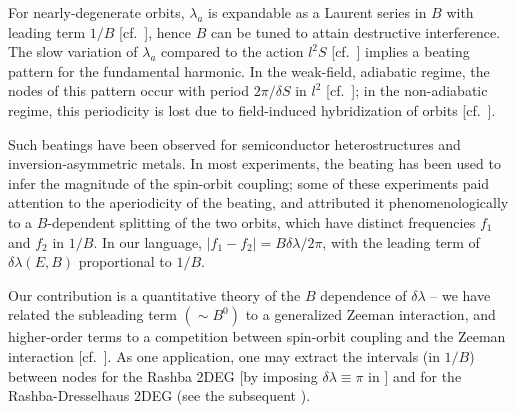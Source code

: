 \documentclass[aps, showpacs, twocolumn, notitlepage, superscriptaddress]{revtex4-1}
\begin{document}
For nearly-degenerate orbits, $\lambda_a$ is expandable as a Laurent series in $B$ with leading term $1/B$ [cf.\ ], hence $B$ can be tuned to attain destructive interference. The slow variation of $\lambda_a$ compared to the action $l^2S$ [cf.\ ] implies a beating pattern for the fundamental harmonic. In the weak-field, adiabatic regime, the nodes of this pattern occur with period $2\pi/\delta S$ in $l^2$ [cf.\ ]; in the non-adiabatic regime, this periodicity is lost due to field-induced hybridization of orbits [cf.\ ]. 

Such beatings have been observed for semiconductor heterostructures\cite{das_evidence_1989,hu_zero-field_1999,wilde_inversion-asymmetry-induced_2009} and inversion-asymmetric metals\cite{terashima_fermi_2008,onuki_chiral-structure-driven_2014,maurya_splitting_2018}. In most experiments, the beating has been used to infer the magnitude of the spin-orbit coupling\cite{das_evidence_1989,onuki_chiral-structure-driven_2014,maurya_splitting_2018}; some of these experiments\cite{das_evidence_1989} paid attention to  the aperiodicity of the beating, and attributed it phenomenologically to a $B$-dependent splitting of the two orbits, which have distinct frequencies $f_1$ and $f_2$ in $1/B$. In our language, $|f_1-f_2|=B\delta\lambda/2\pi$, with the leading term of $\delta \lambda(E,B)$ proportional to $1/B$.

Our contribution is a quantitative theory of the $B$ dependence of $\delta\lambda$ -- we have related the subleading term  $({\sim}B^0)$ to a generalized Zeeman interaction, and higher-order terms to a competition between spin-orbit coupling and the Zeeman interaction [cf.\ ]. As one application, one may extract the intervals (in $1/B$) between nodes for the Rashba 2DEG [by imposing $\delta \lambda{\equiv}\pi$ in ] and for the Rashba-Dresselhaus 2DEG (see the subsequent ).
\end{document}
